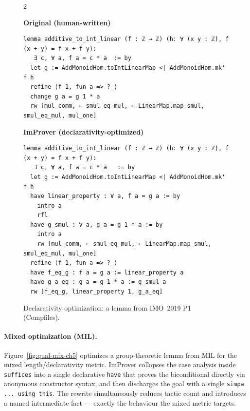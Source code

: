 \setlength{\columnsep}{0.2cm}
\begin{figure}[ht]
\begin{multicols}{2}
{
\textbf{Original (human-written)}
\begin{scriptsize}
\begin{lstlisting}[basicstyle=\scriptsize\ttfamily]
lemma additive_to_int_linear (f : ℤ → ℤ) (h: ∀ (x y : ℤ), f (x + y) = f x + f y):
   ∃ c, ∀ a, f a = c * a  := by
  let g := AddMonoidHom.toIntLinearMap <| AddMonoidHom.mk' f h
  refine ⟨f 1, fun a => ?_⟩
  change g a = g 1 * a
  rw [mul_comm, ← smul_eq_mul, ← LinearMap.map_smul, smul_eq_mul, mul_one]
\end{lstlisting}
\end{scriptsize}
}
\vfill\null
\columnbreak
{
\textbf{ImProver (declarativity-optimized)}
\begin{scriptsize}
\begin{lstlisting}[basicstyle=\scriptsize\ttfamily]
lemma additive_to_int_linear (f : ℤ → ℤ) (h: ∀ (x y : ℤ), f (x + y) = f x + f y):
   ∃ c, ∀ a, f a = c * a   := by
  let g := AddMonoidHom.toIntLinearMap <| AddMonoidHom.mk' f h
  have linear_property : ∀ a, f a = g a := by
    intro a
    rfl
  have g_smul : ∀ a, g a = g 1 * a := by
    intro a
    rw [mul_comm, ← smul_eq_mul, ← LinearMap.map_smul, smul_eq_mul, mul_one]
  refine ⟨f 1, fun a => ?_⟩
  have f_eq_g : f a = g a := linear_property a
  have g_a_eq : g a = g 1 * a := g_smul a
  rw [f_eq_g, linear_property 1, g_a_eq]
\end{lstlisting}
\end{scriptsize}
}
\end{multicols}
\vspace{-2.5em}
\caption{Declarativity optimization: a lemma from IMO~2019 P1 (Compfiles).}
\label{fig:qual-decl-ch5}
\end{figure}

\paragraph{Mixed optimization (MIL).} Figure~\ref{fig:qual-mix-ch5} optimizes a group-theoretic lemma from MIL for the mixed length/declarativity metric. ImProver collapses the case analysis inside \texttt{suffices} into a single declarative \texttt{have} that proves the biconditional directly via anonymous constructor syntax, and then discharges the goal with a single \texttt{simpa ... using this}. The rewrite simultaneously reduces tactic count and introduces a named intermediate fact --- exactly the behaviour the mixed metric targets.

